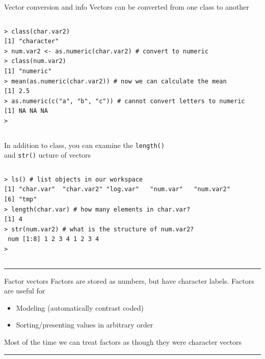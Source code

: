 \documentclass[table,smaller]{beamer}
\begin{document}
\begin{frame}[fragile,label=sec-2-2]{Vector conversion and info}
 Vectors can be converted from one class to another
\vspace{-.5em}
\begin{columns}
\begin{block}{}
\begin{verbatim}
> class(char.var2)
[1] "character"
> num.var2 <- as.numeric(char.var2) # convert to numeric
> class(num.var2)
[1] "numeric"
> mean(as.numeric(char.var2)) # now we can calculate the mean
[1] 2.5
> as.numeric(c("a", "b", "c")) # cannot convert letters to numeric
[1] NA NA NA
>
\end{verbatim}
\end{block}
\end{columns}
\vspace{.5em}

In addition to class, you can examine the \verb~length()~ \\ and \verb~str()~ ucture of vectors
\vspace{-.5em}
\begin{columns}
\begin{block}{}
\begin{verbatim}
> ls() # list objects in our workspace
[1] "char.var"  "char.var2" "log.var"   "num.var"   "num.var2" 
[6] "tmp"      
> length(char.var) # how many elements in char.var?
[1] 4
> str(num.var2) # what is the structure of num.var2?
 num [1:8] 1 2 3 4 1 2 3 4
>
\end{verbatim}
\end{block}
\end{columns}
\vspace{.5em}

\rule{\linewidth}{0.5pt}
\end{frame}
\begin{frame}[label=sec-2-3]{Factor vectors}
Factors are stored as numbers, but have character labels. Factors are useful for
\begin{itemize}
\item Modeling (automatically contrast coded)
\item Sorting/presenting values in arbitrary order
\end{itemize}

Most of the time we can treat factors as though they were character vectors

\rule{\linewidth}{0.5pt}
\end{frame}
\end{document}
